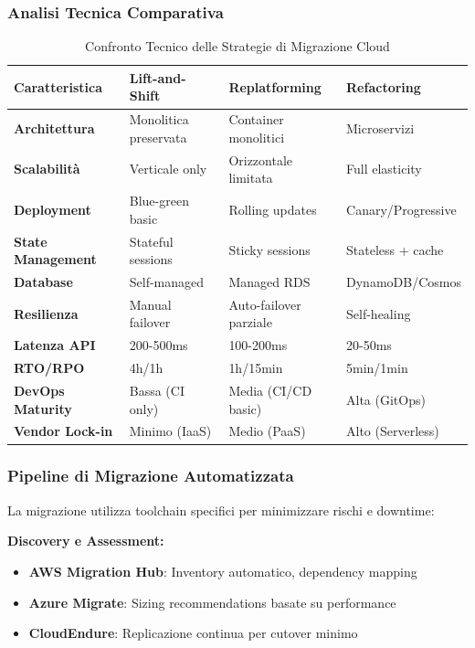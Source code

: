 \subsubsection{Analisi Tecnica Comparativa}

\begin{table}[htbp]
\centering
\caption{Confronto Tecnico delle Strategie di Migrazione Cloud}
\label{tab:cloud_migration_technical}
\begin{tabular}{p{3cm}p{3.5cm}p{3.5cm}p{3.5cm}}
\toprule
\textbf{Caratteristica} & \textbf{Lift-and-Shift} & \textbf{Replatforming} & \textbf{Refactoring} \\
\midrule
\textbf{Architettura} & Monolitica preservata & Container monolitici & Microservizi \\
\textbf{Scalabilità} & Verticale only & Orizzontale limitata & Full elasticity \\
\textbf{Deployment} & Blue-green basic & Rolling updates & Canary/Progressive \\
\textbf{State Management} & Stateful sessions & Sticky sessions & Stateless + cache \\
\textbf{Database} & Self-managed & Managed RDS & DynamoDB/Cosmos \\
\textbf{Resilienza} & Manual failover & Auto-failover parziale & Self-healing \\
\textbf{Latenza API} & 200-500ms & 100-200ms & 20-50ms \\
\textbf{RTO/RPO} & 4h/1h & 1h/15min & 5min/1min \\
\textbf{DevOps Maturity} & Bassa (CI only) & Media (CI/CD basic) & Alta (GitOps) \\
\textbf{Vendor Lock-in} & Minimo (IaaS) & Medio (PaaS) & Alto (Serverless) \\
\bottomrule
\end{tabular}
\end{table}

\subsubsection{Pipeline di Migrazione Automatizzata}

La migrazione utilizza toolchain specifici per minimizzare rischi e downtime:

\textbf{Discovery e Assessment:}
\begin{itemize}
    \item \textbf{AWS Migration Hub}: Inventory automatico, dependency mapping
    \item \textbf{Azure Migrate}: Sizing recommendations basate su performance
    \item \textbf{CloudEndure}: Replicazione continua per cutover minimo
\end{itemize}

